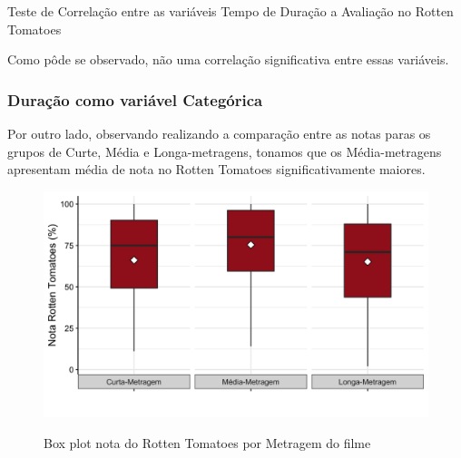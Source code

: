 \documentclass[a4paper, 12pt]{article} %
\begin{document}
\begin{quadro}[H]
\centering
\caption{Teste de Correlação entre as variáveis Tempo de Duração a Avaliação no Rotten Tomatoes }
\label{R-Q-Teste-1}
\vspace{0.1cm}
\end{quadro}

Como pôde se observado, não uma correlação significativa entre essas variáveis. 

\subsubsection{ Duração como variável Categórica}

Por outro lado, observando realizando a comparação entre as notas paras os grupos de Curte, Média e Longa-metragens, tonamos que os Média-metragens apresentam média de nota no Rotten Tomatoes significativamente maiores.

\begin{figure}[H]
    \centering
    \caption{Box plot nota do Rotten Tomatoes por Metragem do filme}
    \includegraphics[scale=0.15]{Fig_Rottem_Metragem.png}
    \label{fig:my_label}
\end{figure}
\end{document}
